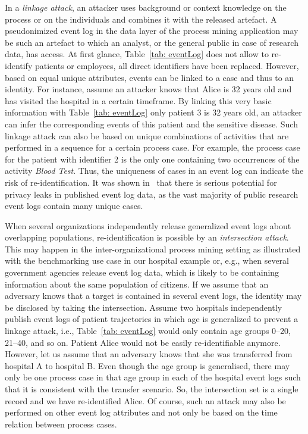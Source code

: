 \documentclass[manuscript]{acmart}
\begin{document}
In a \textit{linkage attack}, an attacker uses background or context knowledge on the process or on the individuals and combines it with the released artefact. A pseudonimized event log in the data layer of the process mining application may be such an artefact to which an analyst, or the general public in case of research data, has access. At first glance, Table~\ref{tab: eventLog} does not allow to re-identify patients or employees, all direct identifiers have been replaced. However, based on equal unique attributes, events can be linked to a case and thus to an identity. 
For instance, assume an attacker knows that Alice is 32 years old and has visited the hospital in a certain timeframe. By linking this very basic information with Table~\ref{tab: eventLog} only patient 3 is 32 years old, an attacker can infer the corresponding events of this patient and the sensitive disease. Such linkage attack can also be based on unique combinations of activities that are performed in a sequence for a certain process case. For example, the process case for the patient with identifier 2 is the only one containing two occurrences of the activity \emph{Blood Test}. Thus, the uniqueness of cases in an event log can indicate the risk of re-identification. It was shown in~\cite{nunez2020quantifying} that there is serious potential for privacy leaks in published event log data, as the vast majority of public research event logs contain many unique cases.

When several organizations independently release generalized event logs about overlapping populations, re-identification is possible by an \textit{intersection attack}. This may happen in the inter-organizational process mining setting as illustrated with the benchmarking use case in our hospital example or, e.g., when several government agencies release event log data, which is likely to be containing information about the same population of citizens. If we assume that an adversary knows that a target is contained in several event logs, the identity may be disclosed by taking the intersection. Assume two hospitals independently publish event logs of patient trajectories in which age is generalized to prevent a linkage attack, i.e., Table~\ref{tab: eventLog} would only contain age groups 0--20, 21--40, and so on. Patient Alice would not be easily re-identifiable anymore. However, let us assume that an adversary knows that she was transferred from hospital A to hospital B. Even though the age group is generalised, there may only be one process case in that age group in each of the hospital event logs such that it is consistent with the transfer scenario. So, the intersection set is a single record and we have re-identified Alice. Of course, such an attack may also be performed on other event log attributes and not only be based on the time relation between process cases. 
\end{document}

